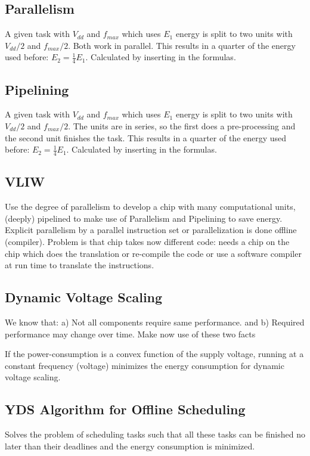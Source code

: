 \subsection{Parallelism}
A given task with $V_{dd}$ and $f_{max}$ which uses $E_1$ energy is split to two units with $V_{dd}/2$ and $f_{max}/2$. Both work in parallel. This results in a quarter of the energy used before: $E_2 = \frac{1}{4}E_1$. Calculated by inserting in the formulas.

\subsection{Pipelining}
A given task with $V_{dd}$ and $f_{max}$ which uses $E_1$ energy is split to two units with $V_{dd}/2$ and $f_{max}/2$. The units are in series, so the first does a pre-processing and the second unit finishes the task. This results in a quarter of the energy used before: $E_2 = \frac{1}{4}E_1$. Calculated by inserting in the formulas.


\subsection{VLIW}
Use the degree of parallelism to develop a chip with many computational units, (deeply) pipelined to make use of Parallelism and Pipelining to save energy. Explicit parallelism by a parallel instruction set or parallelization is done offline (compiler). Problem is that chip takes now different code: needs a chip on the chip which does the translation or re-compile the code or use a software compiler at run time to translate the instructions.

\subsection{Dynamic Voltage Scaling}
We know that: a) Not all components require same performance. and b) Required performance may change over time. Make now use of these two facts


\begin{theorem}[DVS]
If the power-consumption is a convex function of the supply voltage, running at a constant frequency (voltage) minimizes the energy consumption for dynamic voltage scaling.
\end{theorem}

\subsection{YDS Algorithm for Offline Scheduling}
Solves the problem of scheduling tasks such that all these tasks can be finished no later than their deadlines and the energy consumption is  minimized.

